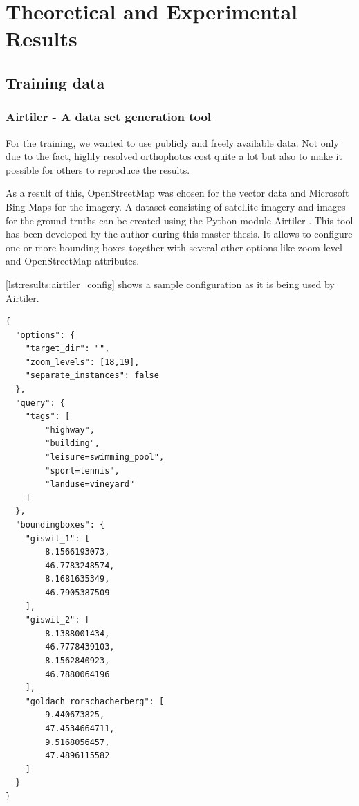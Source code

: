 
\chapter{Theoretical and Experimental Results}\label{chp:theoretical_and_experimental_results}
\section{Training data}
\subsection{Airtiler - A data set generation tool}
For the training, we wanted to use publicly and freely available data. Not only due to the fact, highly resolved orthophotos cost quite a lot but also to make it possible for others to reproduce the results.

As a result of this, OpenStreetMap was chosen for the vector data and Microsoft Bing Maps for the imagery. A dataset consisting of satellite imagery and images for the ground truths can be created using the Python module Airtiler \cite{airtiler}. This tool has been developed by the author during this master thesis. It allows to configure one or more bounding boxes together with several other options like zoom level and OpenStreetMap attributes.

\autoref{lst:results:airtiler_config} shows a sample configuration as it is being used by Airtiler.

\begin{minipage}{\linewidth}
\begin{lstlisting}[caption={Sample configuration for Airtiler},captionpos=b,label=lst:results:airtiler_config]
{
  "options": {
    "target_dir": "",
    "zoom_levels": [18,19],
    "separate_instances": false
  },
  "query": {
    "tags": [
    	"highway",
    	"building",
    	"leisure=swimming_pool",
    	"sport=tennis",
    	"landuse=vineyard"
    ]
  },
  "boundingboxes": {
    "giswil_1": [
    	8.1566193073,
    	46.7783248574,
    	8.1681635349,
    	46.7905387509
    ],
    "giswil_2": [
    	8.1388001434,
    	46.7778439103,
    	8.1562840923,
    	46.7880064196
    ],
    "goldach_rorschacherberg": [
    	9.440673825,
    	47.4534664711,
    	9.5168056457,
    	47.4896115582
    ]
  }
}
\end{lstlisting}
\end{minipage}


